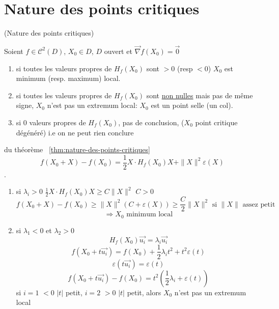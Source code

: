 \documentclass[a4paper]{report}
\let\implies\Rightarrow
\let\epsilon\varepsilon
\theoremstyle{definition}
\begin{document}
\section{Nature des points critiques}
\begin{theorem}\label{thm:nature-des-points-critiques}
    (Nature des points critiques) \par
    Soient $f \in \mathcal{C}^2(D)$,  $X_0 \in D$, $D$ ouvert et  $\vec{\nabla }f(X_0) = \vec{0}$
    \begin{enumerate}
        \item si toutes les valeurs propres de $H_f(X_0)$ sont $> 0$ (resp $< 0$) $X_0$ est minimum (resp. maximum) local.
        \item si toutes les valeurs propres de $H_f(X_0)$ sont \underline{non nulles} mais pas de même signe, $X_0$ n'est pas un extremum local: $X_0$ est un point selle (un col).
        \item si 0 valeurs propres de $H_f(X_0)$, pas de conclusion, ($X_0$ point critique dégénéré) i.e on ne peut rien conclure
    \end{enumerate}
\end{theorem}

\begin{preuve} du théorème ~\ref{thm:nature-des-points-critiques}
   \[
       f(X_0 + X) - f(X_0) = \frac{1}{2}X\cdot H_f(X_0)X + \|X\|^2\epsilon(X)
   \]  
   .
   \begin{enumerate}
       \item si $\lambda_i > 0$  $\frac{1}{2}X \cdot H_f(X_0)X \ge C\|X\|^2$ $C > 0$
            \[
           f(X_0 + X) - f(X_0) \ge \|X\|^2(C + \epsilon(X)) \ge \frac{C}{2}\|X\|^2 \text{ si } \|X\| \text{ assez petit }
           \] 
           \[
           \implies X_0 \text{ minimum local}
           \] 
        \item si $\lambda_1 < 0$ et  $\lambda_2 > 0$
             \[
                 H_f(X_0)\vec{u_i} = \lambda_i\vec{u_i}
            \] 
            \[
                f(X_0 + t\vec{u_i}) = f(X_0) + \frac{1}{2} \lambda_it^2 + t^2\epsilon(t)
            \] 
            \[
                \epsilon(t\vec{u_i}) = \epsilon(t)
            \] 
            \[
                f(X_0 + t\vec{u_i}) - f(X_0) = t^2 (\frac{1}{2}\lambda_i + \epsilon(t))
            \] 
            si $i = 1$  $< 0$  $|t|$ petit,  $i = 2$  $> 0$  $|t|$ petit, alors  $X_0$ n'est pas un extremum local
   \end{enumerate}
\end{preuve}
\end{document}

